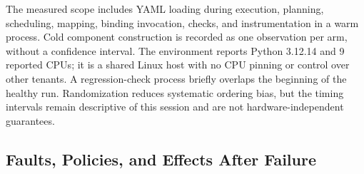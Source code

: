 \documentclass[10pt,twocolumn,a4paper]{article}
\begin{document}
The measured scope includes YAML loading during execution, planning, scheduling, mapping, binding invocation, checks, and instrumentation in a warm process. Cold component construction is recorded as one observation per arm, without a confidence interval. The environment reports Python 3.12.14 and 9 reported CPUs; it is a shared Linux host with no CPU pinning or control over other tenants. A regression-check process briefly overlaps the beginning of the healthy run. Randomization reduces systematic ordering bias, but the timing intervals remain descriptive of this session and are not hardware-independent guarantees.


\subsection{Faults, Policies, and Effects After Failure}
\end{document}
